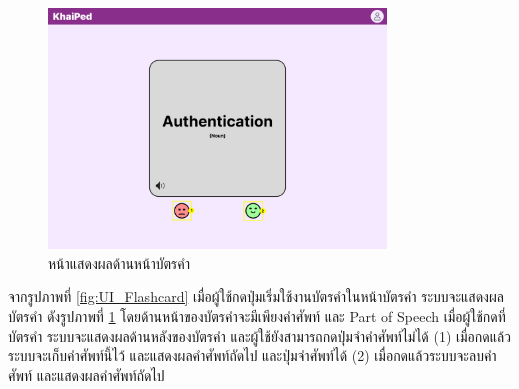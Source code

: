 \documentclass[12pt,oneside,openright,a4paper]{cpe-thai-project}
\begin{document}


\pagebreak
\begin{figure}[!h]\centering
	\includegraphics[width=0.8\textwidth, keepaspectratio=true]{image/chap3/ui/flashcard/Flashcard - Show Card.png}
	\caption{หน้าแสดงผลด้านหน้าบัตรคำ}\label{fig:UI_ShowCard}
\end{figure}
\hspace{1cm}
จากรูปภาพที่ \ref{fig:UI_Flashcard} เมื่อผู้ใช้กดปุ่มเริ่มใช้งานบัตรคำในหน้าบัตรคำ ระบบจะแสดงผลบัตรคำ ดังรูปภาพที่ \ref{fig:UI_ShowCard} โดยด้านหน้าของบัตรคำจะมีเพียงคำศัพท์ และ Part of Speech เมื่อผู้ใช้กดที่บัตรคำ
ระบบจะแสดงผลด้านหลังของบัตรคำ และผู้ใช้ยังสามารถกดปุ่มจำคำศัพท์ไม่ได้ (1) เมื่อกดแล้วระบบจะเก็บคำศัพท์นี้ไว้ และแสดงผลคำศัพท์ถัดไป และปุ่มจำศัพท์ได้ (2)
เมื่อกดแล้วระบบจะลบคำศัพท์ และแสดงผลคำศัพท์ถัดไป
\end{document}
